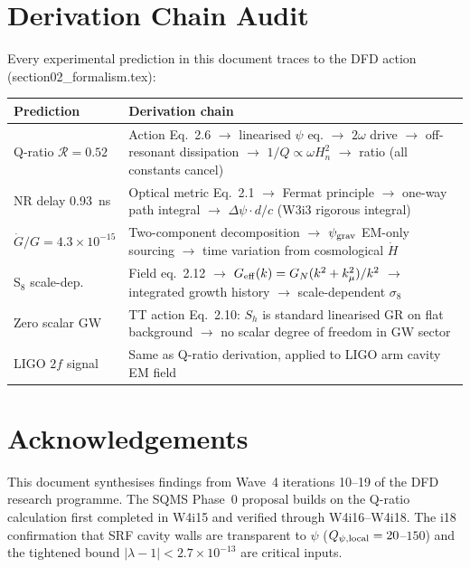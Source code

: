 \documentclass[11pt]{article}
\newcommand{\ee}[1]{\times 10^{#1}}
\newcommand{\lbone}{|\lambda - 1|}
\newcommand{\Rq}{\mathcal{R}}
\newcommand{\Heff}{H_n}
\begin{document}
\section{Derivation Chain Audit}
\label{sec:derivation-audit}

Every experimental prediction in this document traces to the DFD action
(section02\_formalism.tex):

\begin{center}
\renewcommand{\arraystretch}{1.3}
\begin{tabular}{@{}p{4cm}p{8cm}@{}}
\toprule
\textbf{Prediction} & \textbf{Derivation chain} \\
\midrule
Q-ratio $\Rq = 0.52$ &
Action Eq.~2.6 $\to$ linearised $\psi$ eq. $\to$ $2\omega$ drive $\to$
off-resonant dissipation $\to$ $1/Q \propto \omega\Heff^2$ $\to$ ratio
(all constants cancel) \\
NR delay 0.93~ns &
Optical metric Eq.~2.1 $\to$ Fermat principle $\to$ one-way path integral
$\to$ $\Delta\psi \cdot d/c$ (W3i3 rigorous integral) \\
$\dot{G}/G = 4.3\ee{-15}$ &
Two-component decomposition $\to$ $\psi_{\rm grav}$ EM-only sourcing
$\to$ time variation from cosmological $\dot{H}$ \\
S$_8$ scale-dep. &
Field eq.~2.12 $\to$ $G_{\rm eff}(k) = G_N(k^2+k_\mu^2)/k^2$ $\to$
integrated growth history $\to$ scale-dependent $\sigma_8$ \\
Zero scalar GW &
TT action Eq.~2.10: $S_h$ is standard linearised GR on flat background
$\to$ no scalar degree of freedom in GW sector \\
LIGO $2f$ signal &
Same as Q-ratio derivation, applied to LIGO arm cavity EM field \\
\bottomrule
\end{tabular}
\end{center}


\section*{Acknowledgements}

This document synthesises findings from Wave~4 iterations 10--19 of
the DFD research programme. The SQMS Phase~0 proposal builds on the
Q-ratio calculation first completed in W4i15 and verified through
W4i16--W4i18. The i18 confirmation that SRF cavity walls are transparent
to $\psi$ ($Q_{\psi,\rm local} = 20$--$150$) and the tightened bound
$\lbone < 2.7\ee{-13}$ are critical inputs.
\end{document}

